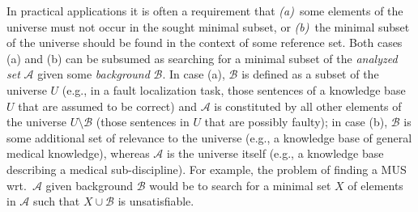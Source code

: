 \documentclass[]{elsarticle}
\newcommand{\ma}{\mathcal{A}}
\newcommand{\mb}{\mathcal{B}}
\begin{document}
	In practical applications it is often a requirement that \emph{(a)}~some elements of the universe must not occur in the sought minimal subset, 
	or \emph{(b)}~the minimal subset of the universe should be found in the context of some reference set. Both cases (a) and (b) can be subsumed as searching for a minimal subset of the \emph{analyzed set} $\ma$ given some \emph{background} $\mb$. In case (a), $\mb$ is defined as a subset of the universe $U$ (e.g., in a fault localization task, those sentences of a knowledge base $U$ that are assumed to be correct) and $\ma$ is constituted by all other elements of the universe $U\setminus\mb$ (those sentences in $U$ that are possibly faulty); in case (b), $\mb$ is some additional set of relevance to the universe (e.g., a knowledge base of general medical knowledge), whereas $\ma$ is the universe itself (e.g., a knowledge base describing a medical sub-discipline). 
	For example, the problem of finding a MUS wrt.\ $\ma$ given background $\mb$ would be to search for a minimal set $X$ of elements in $\ma$ such that $X \cup \mb$ is unsatisfiable.
\end{document}
